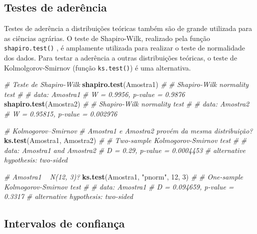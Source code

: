 \documentclass[
]{book}
\newenvironment{Shaded}{\begin{snugshade}}{\end{snugshade}}
\newcommand{\CommentTok}[1]{\textcolor[rgb]{0.56,0.35,0.01}{\textit{#1}}}
\newcommand{\DecValTok}[1]{\textcolor[rgb]{0.00,0.00,0.81}{#1}}
\newcommand{\KeywordTok}[1]{\textcolor[rgb]{0.13,0.29,0.53}{\textbf{#1}}}
\newcommand{\NormalTok}[1]{#1}
\newcommand{\StringTok}[1]{\textcolor[rgb]{0.31,0.60,0.02}{#1}}
\begin{document}
\hypertarget{testes-de-aderuxeancia}{%
\subsection{Testes de aderência}\label{testes-de-aderuxeancia}}

Testes de aderência a distribuições teóricas também são de grande utilizada para as ciências agrárias. O teste de Shapiro-Wilk, realizado pela função \texttt{shapiro.test()} , é amplamente utilizada para realizar o teste de normalidade dos dados. Para testar a aderência a outras distribuições teóricas, o teste de Kolmolgorov-Smirnov (função \texttt{ks.test()})  é uma alternativa.

\begin{Shaded}
\begin{Highlighting}[]
\CommentTok{# Teste de Shapiro-Wilk}
\KeywordTok{shapiro.test}\NormalTok{(Amostra1)}
\CommentTok{# }
\CommentTok{# 	Shapiro-Wilk normality test}
\CommentTok{# }
\CommentTok{# data:  Amostra1}
\CommentTok{# W = 0.9956, p-value = 0.9876}
\KeywordTok{shapiro.test}\NormalTok{(Amostra2)}
\CommentTok{# }
\CommentTok{# 	Shapiro-Wilk normality test}
\CommentTok{# }
\CommentTok{# data:  Amostra2}
\CommentTok{# W = 0.95815, p-value = 0.002976}

\CommentTok{# Kolmogorov–Smirnov}
\CommentTok{# Amostra1 e Amostra2 provém da mesma distribuição?}
\KeywordTok{ks.test}\NormalTok{(Amostra1, Amostra2)}
\CommentTok{# }
\CommentTok{# 	Two-sample Kolmogorov-Smirnov test}
\CommentTok{# }
\CommentTok{# data:  Amostra1 and Amostra2}
\CommentTok{# D = 0.29, p-value = 0.0004453}
\CommentTok{# alternative hypothesis: two-sided}

\CommentTok{# Amostra1 ~ N(12, 3)?}
\KeywordTok{ks.test}\NormalTok{(Amostra1, }\StringTok{"pnorm"}\NormalTok{, }\DecValTok{12}\NormalTok{, }\DecValTok{3}\NormalTok{)}
\CommentTok{# }
\CommentTok{# 	One-sample Kolmogorov-Smirnov test}
\CommentTok{# }
\CommentTok{# data:  Amostra1}
\CommentTok{# D = 0.094659, p-value = 0.3317}
\CommentTok{# alternative hypothesis: two-sided}
\end{Highlighting}
\end{Shaded}

\hypertarget{intervalos-de-confianuxe7a}{%
\subsection{Intervalos de confiança}\label{intervalos-de-confianuxe7a}}
\end{document}
